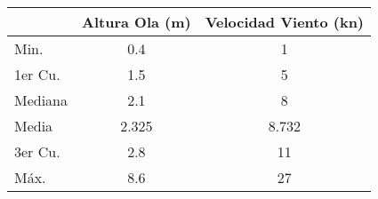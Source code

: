 \begin{tabular}{lS[table-format=1.3]S[table-format=2.3]}
    \toprule
    & {Altura Ola (\si{\meter})} & {Velocidad Viento (\si{\knot})} \\
    \midrule
 Min.   &0.4   &  1\\ 
 1er Cu.&1.5   &  5\\ 
 Mediana &2.1   &  8\\ 
 Media   &2.325   &  8.732   \\ 
 3er Cu.&2.8   & 11\\ 
 Máx.   &8.6   & 27\\ 
    \bottomrule
\end{tabular}
